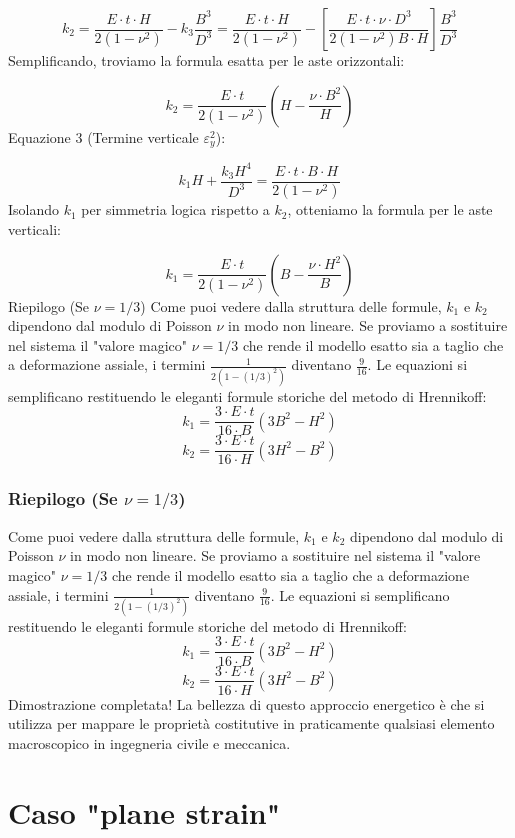 \documentclass[a4paper]{article}
\begin{document}
$$k_2 = \frac{E \cdot t \cdot H}{2(1-\nu^2)} - k_3 \frac{B^3}{D^3} = \frac{E \cdot t \cdot H}{2(1-\nu^2)} - \left[ \frac{E \cdot t \cdot \nu \cdot D^3}{2(1-\nu^2) B \cdot H} \right] \frac{B^3}{D^3}$$
Semplificando, troviamo la formula esatta per le aste orizzontali:

$$k_2 = \frac{E \cdot t}{2(1-\nu^2)} \left( H - \frac{\nu \cdot B^2}{H} \right)$$
Equazione 3 (Termine verticale $\varepsilon_y^2$):

$$k_1 H + \frac{k_3 H^4}{D^3} = \frac{E \cdot t \cdot B \cdot H}{2(1-\nu^2)}$$
Isolando $k_1$ per simmetria logica rispetto a $k_2$, otteniamo la formula per le aste verticali:

$$k_1 = \frac{E \cdot t}{2(1-\nu^2)} \left( B - \frac{\nu \cdot H^2}{B} \right)$$
Riepilogo (Se $\nu = 1/3$)
Come puoi vedere dalla struttura delle formule, $k_1$ e $k_2$ dipendono dal modulo di Poisson $\nu$ in modo non lineare.
Se proviamo a sostituire nel sistema il "valore magico" $\nu = 1/3$ che rende il modello esatto sia a taglio che a deformazione assiale, i termini $\frac{1}{2(1-(1/3)^2)}$ diventano $\frac{9}{16}$.
Le equazioni si semplificano restituendo le eleganti formule storiche del metodo di Hrennikoff:
$$k_1 = \frac{3 \cdot E \cdot t}{16 \cdot B} (3B^2 - H^2)$$
$$k_2 = \frac{3 \cdot E \cdot t}{16 \cdot H} (3H^2 - B^2)$$
\subsubsection{Riepilogo (Se $\nu = 1/3$)}
Come puoi vedere dalla struttura delle formule, $k_1$ e $k_2$ dipendono dal modulo di Poisson $\nu$ in modo non lineare.
Se proviamo a sostituire nel sistema il "valore magico" $\nu = 1/3$ che rende il modello esatto sia a taglio che a deformazione assiale, i termini $\frac{1}{2(1-(1/3)^2)}$ diventano $\frac{9}{16}$.
Le equazioni si semplificano restituendo le eleganti formule storiche del metodo di Hrennikoff:
$$k_1 = \frac{3 \cdot E \cdot t}{16 \cdot B} (3B^2 - H^2)$$
$$k_2 = \frac{3 \cdot E \cdot t}{16 \cdot H} (3H^2 - B^2)$$
Dimostrazione completata! La bellezza di questo approccio energetico è che si utilizza per mappare le proprietà costitutive in praticamente qualsiasi elemento macroscopico in ingegneria civile e meccanica.


\section{Caso "plane strain"}
\end{document}
